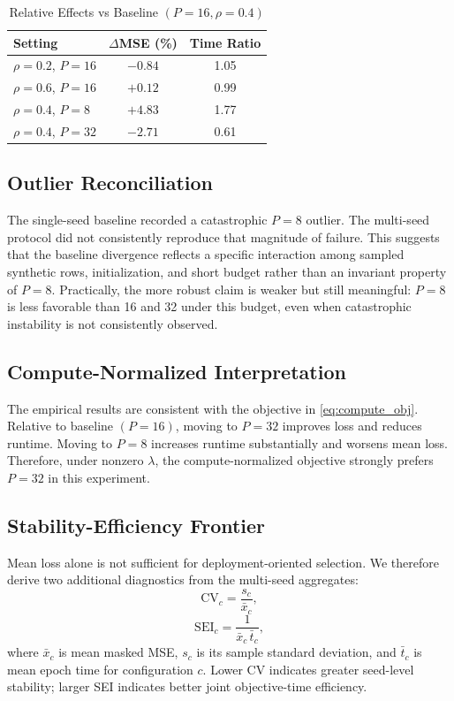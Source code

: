 \documentclass[conference]{IEEEtran}
\begin{document}
\begin{table}[t]
\caption{Relative Effects vs Baseline $(P=16,\rho=0.4)$}
\label{tab:effects}
\centering
\begin{tabular}{lcc}
\toprule
Setting & $\Delta$MSE (\%) & Time Ratio \\
\midrule
$\rho=0.2$, $P=16$ & $-0.84$ & 1.05 \\
$\rho=0.6$, $P=16$ & $+0.12$ & 0.99 \\
$\rho=0.4$, $P=8$  & $+4.83$ & 1.77 \\
$\rho=0.4$, $P=32$ & $-2.71$ & 0.61 \\
\bottomrule
\end{tabular}
\end{table}

\subsection{Outlier Reconciliation}
The single-seed baseline recorded a catastrophic $P=8$ outlier. The multi-seed protocol did not consistently reproduce that magnitude of failure. This suggests that the baseline divergence reflects a specific interaction among sampled synthetic rows, initialization, and short budget rather than an invariant property of $P=8$. Practically, the more robust claim is weaker but still meaningful: $P=8$ is less favorable than 16 and 32 under this budget, even when catastrophic instability is not consistently observed.

\subsection{Compute-Normalized Interpretation}
The empirical results are consistent with the objective in \eqref{eq:compute_obj}. Relative to baseline $(P=16)$, moving to $P=32$ improves loss and reduces runtime. Moving to $P=8$ increases runtime substantially and worsens mean loss. Therefore, under nonzero $\lambda$, the compute-normalized objective strongly prefers $P=32$ in this experiment.

\subsection{Stability-Efficiency Frontier}
Mean loss alone is not sufficient for deployment-oriented selection. We therefore derive two additional diagnostics from the multi-seed aggregates:
\begin{equation}
\mathrm{CV}_c = \frac{s_c}{\bar{x}_c},
\label{eq:cv_metric}
\end{equation}
\begin{equation}
\mathrm{SEI}_c = \frac{1}{\bar{x}_c\,\bar{t}_c},
\label{eq:sei_metric}
\end{equation}
where $\bar{x}_c$ is mean masked MSE, $s_c$ is its sample standard deviation, and $\bar{t}_c$ is mean epoch time for configuration $c$. Lower CV indicates greater seed-level stability; larger SEI indicates better joint objective-time efficiency.
\end{document}
